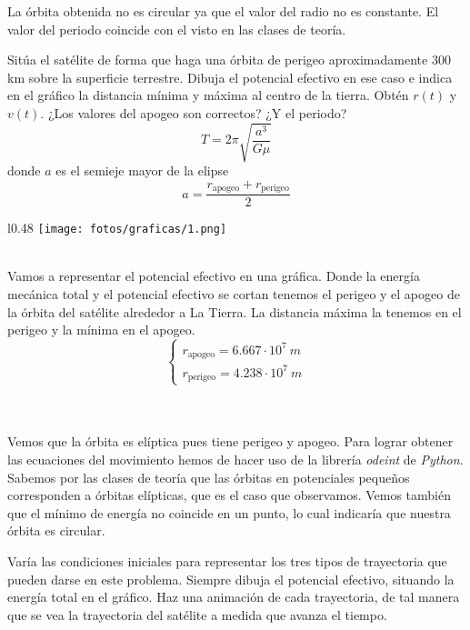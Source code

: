 \documentclass[11pt]{article}
\newcommand{\laputa}[1]{\begin{note}{#1}{}\end{note}}
\begin{document}
            \noindent La órbita obtenida no es circular ya que el valor del radio no es constante. El valor del periodo coincide con el visto en las clases de teoría.
        
        \laputa{Sitúa el satélite de forma que haga una órbita de perigeo aproximadamente $300$ km sobre la superficie terrestre. Dibuja el potencial efectivo en ese caso e indica en el gráfico la distancia mínima y máxima al centro de la tierra. Obtén $r(t)$ y $v(t)$. ¿Los valores del apogeo son correctos? ¿Y el periodo? 
        \[T=2\pi\sqrt{\dfrac{a^3}{G\mu}}\]
        donde $a$ es el semieje mayor de la elipse
        \[a=\dfrac{r_\text{apogeo}+r_\text{perigeo}}{2}\]}

            \begin{wrapfigure}[12]{l}{0.48\textwidth}
                \vspace{-0.42cm}
                \centering
                \texttt{[image: fotos/graficas/1.png]}
            \end{wrapfigure}

            \hspace{0cm}\\\noindent Vamos a representar el potencial efectivo en una gráfica. Donde la energía mecánica total y el potencial efectivo se cortan tenemos el perigeo y el apogeo de la órbita del satélite alrededor a La Tierra. La distancia máxima la tenemos en el perigeo y la mínima en el apogeo.            
            \[\left\{\begin{aligned}
                r_\text{apogeo}= 6.667\cdot 10^{7}\ m\\
                r_\text{perigeo}=4.238\cdot 10^{7}\ m
            \end{aligned}\right.\]

            \hspace{0cm}\\\hspace{0cm}\\\noindent Vemos que la órbita es elíptica pues tiene perigeo y apogeo. Para lograr obtener las ecuaciones del movimiento hemos de hacer uso de la librería \textit{odeint} de \textit{Python}. Sabemos por las clases de teoría que las órbitas en potenciales pequeños corresponden a órbitas elípticas, que es el caso que observamos. Vemos también que el mínimo de energía no coincide en un punto, lo cual indicaría que nuestra órbita es circular.

        \clearpage
        \laputa{Varía las condiciones iniciales para representar los tres tipos de trayectoria que pueden darse en este problema. Siempre dibuja el potencial efectivo, situando la energía total en el gráfico. Haz una animación de cada trayectoria, de tal manera que se vea la trayectoria del satélite a medida que avanza el tiempo.}
\end{document}
